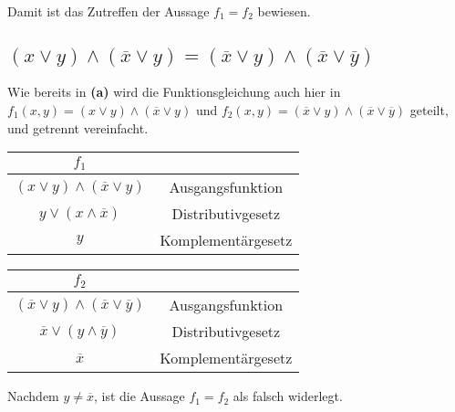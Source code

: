 \documentclass{article}
\begin{document}
Damit ist das Zutreffen der Aussage $f_1 = f_2$ bewiesen.

\clearpage

\subsection{$(x \lor y) \land (\overline{x} \lor y) = (\overline{x} \lor y) \land (\overline{x} \lor \overline{y})$}

Wie bereits in \textbf{(a)} wird die Funktionsgleichung auch hier in $f_1(x, y) = (x \lor y) \land (\overline{x} \lor y)$ und $f_2(x, y) = (\overline{x} \lor y) \land (\overline{x} \lor \overline{y})$ geteilt, und getrennt vereinfacht.

\begin{center}
\begin{tabular}{c | c}
    $f_1$\\
    \hline
    $(x \lor y) \land (\overline{x} \lor y)$ & Ausgangsfunktion\\
    $y \lor (x \land \overline{x})$ & Distributivgesetz\\
    $y$ & Komplementärgesetz
\end{tabular}
\end{center}

\begin{center}
\begin{tabular}{c | c}
    $f_2$\\
    \hline
    $(\overline{x} \lor y) \land (\overline{x} \lor \overline{y})$ & Ausgangsfunktion\\
    $\overline{x} \lor (y \land \overline{y})$ & Distributivgesetz\\
    $\overline{x}$ & Komplementärgesetz
\end{tabular}
\end{center}

Nachdem $y \neq \overline{x}$, ist die Aussage $f_1 = f_2$ als falsch widerlegt.
\end{document}
